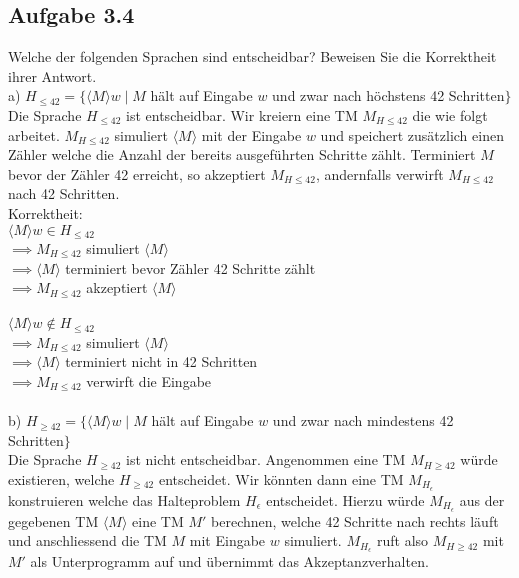 \newpage
\subsection*{Aufgabe 3.4}
Welche der folgenden Sprachen sind entscheidbar? Beweisen Sie die Korrektheit ihrer Antwort.\\
a) $H_{\leq 42} = \{\langle M \rangle w \mid M$ hält auf Eingabe $w$ und zwar nach höchstens 42 Schritten$\}$\\

Die Sprache $H_{\leq 42}$ ist entscheidbar. Wir kreiern eine 
TM $M_{H \leq 42}$ die wie folgt arbeitet. $M_{H \leq 42}$
 simuliert $\langle M \rangle$ mit der Eingabe $w$ und 
speichert zusätzlich einen Zähler welche die Anzahl der bereits
ausgeführten Schritte
zählt. Terminiert $M$ bevor der Zähler 42 erreicht, so akzeptiert
$M_{H \leq 42}$, andernfalls verwirft $M_{H \leq 42}$ nach 42
Schritten.\\

Korrektheit:\\

$\langle M \rangle w \in H_{\leq42}$\\
$\implies M_{H\leq42}$ simuliert $\langle M \rangle$\\
$\implies \langle M \rangle$ terminiert bevor Zähler 42 Schritte zählt\\
$\implies M_{H\leq42}$ akzeptiert $\langle M \rangle$\\
\\

$\langle M \rangle w \not\in H_{\leq42}$\\
$\implies M_{H\leq42}$ simuliert $\langle M \rangle$\\
$\implies \langle M \rangle$ terminiert nicht in 42 Schritten\\
$\implies M_{H\leq42}$ verwirft die Eingabe\\
\\


b) $H_{\geq 42} = \{\langle M \rangle w \mid M$ hält auf Eingabe $w$ und zwar nach mindestens 42 Schritten$\}$\\

Die Sprache $H_{\geq 42}$ ist nicht entscheidbar. Angenommen eine 
TM $M_{H\geq 42}$ würde existieren, welche $H_{\geq 42}$
entscheidet. Wir könnten dann eine TM $M_{H_{\epsilon}}$
konstruieren welche das Halteproblem $H_{\epsilon}$ entscheidet.
Hierzu würde $M_{H_{\epsilon}}$ aus der gegebenen TM $\langle M 
\rangle$ eine TM 
$M'$ berechnen, welche 42 Schritte nach rechts läuft und 
anschliessend die TM $M$ mit Eingabe $w$ simuliert. 
$M_{H_{\epsilon}}$ ruft also $M_{H\geq 42}$ mit $M'$ als 
Unterprogramm auf und übernimmt das Akzeptanzverhalten.

